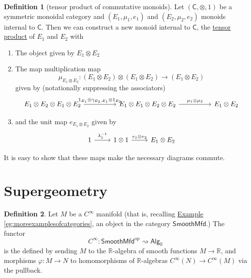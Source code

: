 \documentclass[a4paper,10pt]{scrreprt}
\newcommand{\R}{\mathbb{R}}
\newcommand{\defn}[1]{\ul{#1}}
\theoremstyle{definition}
\newtheorem{definition}{Definition}[section]
\theoremstyle{plain}
\theoremstyle{remark}
\begin{document}
\begin{definition}[tensor product of commutative monoids]
  \label{def:tensorproductofcommutativemonoids}
  Let $(\mathsf{C}, \otimes, 1)$ be a symmetric monoidal category and $(E_{1}, \mu_{1}, e_{1})$ and $(E_{2}, \mu_{2}, e_{2})$ monoids internal to $\mathsf{C}$. Then we can construct a new monoid internal to $\mathsf{C}$, the \defn{tensor product} of $E_{1}$ and $E_{2}$ with

  \begin{enumerate}
    \item The object given by $E_{1} \otimes E_{2}$

    \item The map multiplication map
      \begin{equation*}
        \mu_{E_{1} \otimes E_{2}}\colon (E_{1} \otimes E_{2}) \otimes (E_{1} \otimes E_{2}) \to (E_{1} \otimes E_{2})
      \end{equation*}
      given by (notationally suppressing the associators)
      \begin{equation*}
        \begin{tikzcd}[column sep=huge]
          E_{1} \otimes E_{2} \otimes E_{1} \otimes E_{2} 
          \arrow[r, "{1_{E_{1}} \otimes \gamma_{E_{2}, E_{1}} \otimes 1_{E_{2}}}"]
          & E_{1} \otimes E_{1} \otimes E_{2} \otimes E_{2}  
          \arrow[r, "\mu_{1} \otimes \mu_{2}"]
          & E_{1} \otimes E_{2}
        \end{tikzcd}
      \end{equation*}

    \item and the unit map $e_{E_{1} \otimes E_{2}}$ given by
      \begin{equation*}
        \begin{tikzcd}
          1
          \arrow[r, "\lambda^{-1}_{1}"]
          & 1 \otimes 1
          \arrow[r, "e_{1} \otimes e_{2}"]
          & E_{1} \otimes E_{2}
        \end{tikzcd}
      \end{equation*}
  \end{enumerate}

  It is easy to show that these maps make the necessary diagrams commute.
\end{definition}


\section{Supergeometry}
\begin{definition}
  \label{def:functorcinfinity}
  Let $M$ be a $C^{\infty}$ manifold (that is, recalling \hyperref[eg:moreexamplesofcategories]{Example \ref*{eg:moreexamplesofcategories}}, an object in the category $\mathsf{SmoothMfd}$.) The functor 
  \begin{equation*}
    C^{\infty}\colon \mathsf{SmoothMfd}^{\mathrm{op}} \rightsquigarrow \mathsf{Alg}_{\R}
  \end{equation*}
  is the defined by sending $M$ to the $\R$-algebra of smooth functions $M \to \R$, and morphisms $\varphi\colon M \to N$ to homomorphisms of $\R$-algebras $C^{\infty}(N) \to C^{\infty}(M)$ via the pullback. 
\end{definition}
\end{document}
